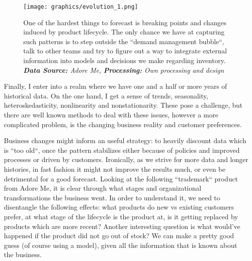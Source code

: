 \documentclass[12pt]{article}
\begin{document}
\begin{figure}[!ht]
	\centering
	\texttt{[image: graphics/evolution\_1.png]}%
	\caption{One of the hardest things to forecast is breaking points and changes induced by product lifecycle. The only chance we have at capturing such patterns is to step outside the ``demand management bubble``, talk to other teams and try to figure out a way to integrate external information into models and decisions we make regarding inventory. \\
		\textit{\textbf{Data Source:} Adore Me, \textbf{Processing:} Own processing and design}}
\end{figure}

Finally, I enter into a realm where we have one and a half or more years of historical data. On the one hand, I get a sense of trends, seasonality, heteroskedasticity, nonlinearity and nonstationarity. These pose a challenge, but there are well known methods to deal with these issues, however a more complicated problem, is the changing business reality and customer preferences. 

Business changes might inform an useful strategy: to heavily discount data which is ``too old``, once the pattern stabilizes either because of policies and improved processes or driven by customers. Ironically, as we strive for more data and longer histories, in fast fashion it might not improve the results much, or even be detrimental for a good forecast. Looking at the following ``trademark`` product from Adore Me, it is clear through what stages and organizational transformations the business went. In order to understand it, we need to disentangle the following effects: what products do new vs existing customers prefer, at what stage of the lifecycle is the product at, is it getting replaced by products which are more recent? Another interesting question is what would've happened if the product did not go out of stock? We can make a pretty good guess (of course using a model), given all the information that is known about the business.








\newpage



\end{document}
